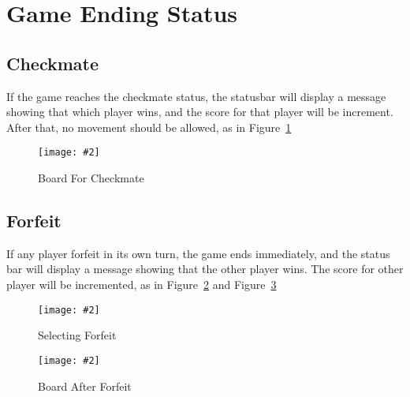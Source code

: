 \documentclass[12pt]{article}
\newcommand{\img}[3]{
\begin{figure}[!ht]
\begin{center}
\texttt{[image: \#2]}
\caption{#3}\label{#2}
\end{center}
\end{figure}
}
\begin{document}
\section{Game Ending Status}

\subsection{Checkmate}
If the game reaches the checkmate status, the statusbar will display a message showing that which player wins, and the score for that player will be increment. After that, no movement should be allowed, as in Figure~\ref{board_checkmate}
\img{0.4}{board_checkmate}{Board For Checkmate}

\subsection{Forfeit}
If any player forfeit in its own turn, the game ends immediately, and the status bar will display a message showing that the other player wins. The score for other player will be incremented, as in Figure~\ref{board_forfeit} and Figure~\ref{board_after_forfeit}
\img{0.4}{board_forfeit}{Selecting Forfeit}
\img{0.4}{board_after_forfeit}{Board After Forfeit}
\end{document}
